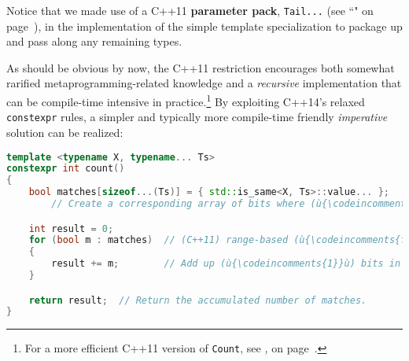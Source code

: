 \noindent Notice that we made use of a C++11 \textbf{parameter pack},
\texttt{Tail...} (see ``" on page~\pageref{variadictemplate}), in the
implementation of the simple template specialization to package up and
pass along any remaining types.

As should be obvious by now, the C++11 restriction encourages both
somewhat rarified metaprogramming-related knowledge and a
\emph{recursive} implementation that can be compile-time intensive in
practice.{\cprotect\footnote{For a more efficient C++11 version of
\texttt{Count}, see \textit{, } on page~\pageref{constexpr-typelist-count-algorithm}.}} By exploiting C++14's relaxed
\texttt{constexpr} rules, a simpler and typically more compile-time
friendly \emph{imperative} solution can be realized:

\begin{lstlisting}[language=C++]
template <typename X, typename... Ts>
constexpr int count()
{
    bool matches[sizeof...(Ts)] = { std::is_same<X, Ts>::value... };
        // Create a corresponding array of bits where (ù{\codeincomments{1}}ù) indicates sameness.

    int result = 0;
    for (bool m : matches)  // (C++11) range-based (ù{\codeincomments{for}}ù) loop
    {
        result += m;        // Add up (ù{\codeincomments{1}}ù) bits in the array.
    }

    return result;  // Return the accumulated number of matches.
}
\end{lstlisting}

